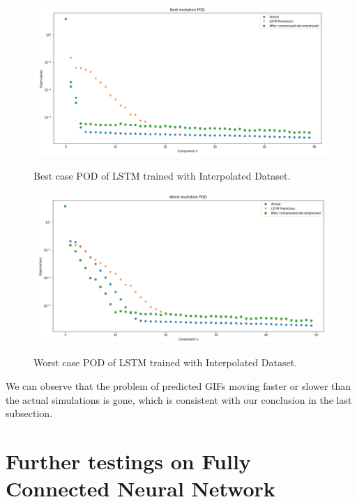 \begin{figure}[H]
    \caption{Best case POD of LSTM trained with Interpolated Dataset.}
    \includegraphics[scale=0.5]{figures/mantle_convection_images/larger_dataset_interpolated/LSTM_Best_POD.png}
    \label{figure:LSTM_interpolated_best_POD}
\end{figure}

\begin{figure}[H]
    \caption{Worst case POD of LSTM trained with Interpolated Dataset.}
    \includegraphics[scale=0.5]{figures/mantle_convection_images/larger_dataset_interpolated/LSTM_Worst_POD.png}
    \label{figure:LSTM_interpolated_worst_POD}
\end{figure}


We can observe that the problem of predicted GIFs moving faster or slower than the actual simulations is gone, which is consistent with our conclusion in the last subsection.




\section{Further testings on Fully Connected Neural Network}

